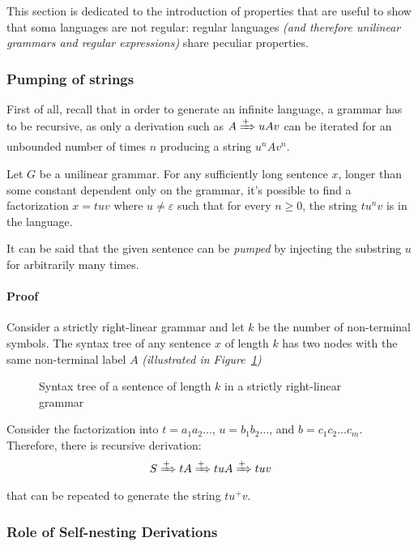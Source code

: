 \documentclass[english]{article}
\begin{document}
This section is dedicated to the introduction of properties that are useful to show that soma languages are not regular:
regular languages \textit{(and therefore unilinear grammars and regular expressions)} share peculiar properties.

\subsubsection{Pumping of strings}

First of all, recall that in order to generate an infinite language, a grammar has to be recursive, as only a derivation such as \(A \xRightarrow{+} u A v\) can be iterated for an unbounded number of times \(n\) producing a string \(u^n A v^n\).

Let \(G\) be a unilinear grammar.
For any sufficiently long sentence \(x\), longer than some constant dependent only on the grammar, it's possible to find a factorization \(x = tuv\) where \(u \neq \varepsilon\) such that for every \(n \geq 0\), the string \(t u^n v\) is in the language.

It can be said that the given sentence can be \textit{pumped} by injecting the substring \(u\) for arbitrarily many times.

\paragraph{Proof}

Consider a strictly right-linear grammar and let \(k\) be the number of non-terminal symbols.
The syntax tree of any sentence \(x\) of length \(k\) has two nodes with the same non-terminal label \(A\) \textit{(illustrated in Figure~\ref{fig:pumping-strings-syntax-tree})}

\begin{figure}[htbp]
  \centering
  \bigskip
  \caption{Syntax tree of a sentence of length \(k\) in a strictly right-linear grammar}
  \label{fig:pumping-strings-syntax-tree}
  \bigskip
\end{figure}

Consider the factorization into \(t = a_1 a_2 \ldots\), \(u = b_1 b_2 \ldots\), and \(b = c_1 c_2 \ldots c_m\).
Therefore, there is recursive derivation:
\[S \xRightarrow{+} t A \xRightarrow{+} tuA \xRightarrow{+} tuv \]
that can be repeated to generate the string \(tu^+ v\).

\subsubsection{Role of Self-nesting Derivations}
\end{document}
